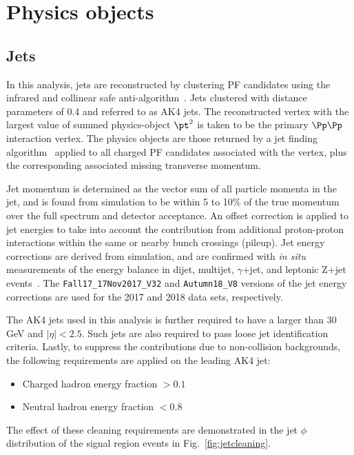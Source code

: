 \section{Physics objects} \label{sec:objects}

\subsection{Jets}
\label{sec:objects_ak4}
In this analysis, jets are reconstructed by clustering PF candidates
using the infrared and collinear safe anti-\kt algorithm~\cite{Cacciari:2008gp}. Jets clustered
with distance parameters of 0.4 and referred to as AK4 jets.
The reconstructed vertex with the largest value of summed physics-object $\pt^2$ is taken to
be the primary $\Pp\Pp$ interaction vertex. The physics objects are those returned by a
jet finding algorithm~\cite{Cacciari:2008gp,Cacciari:2011ma} applied to all charged PF candidates
associated with the vertex, plus the corresponding associated missing transverse momentum.

Jet momentum is determined as the vector sum of all particle momenta in the jet,
and is found from simulation to be within 5 to 10\% of the true momentum over the full \pt
spectrum and detector acceptance. An offset correction is applied to jet energies to take
into account the contribution from additional proton-proton interactions within the
same or nearby bunch crossings (pileup). Jet energy corrections are derived from simulation,
and are confirmed with {\it in situ} measurements of the energy balance in dijet, multijet,
$\gamma$+jet, and leptonic Z+jet events~\cite{Khachatryan:2016kdb}. The \texttt{Fall17\_17Nov2017\_V32} and \texttt{Autumn18\_V8}
versions of the jet energy corrections are used for the 2017 and 2018 data sets, respectively.

The AK4 jets used in this analysis is further required to have a \pt larger than 30 GeV
and $|\eta| < 2.5$. Such jets are also required to pass loose jet identification criteria.
Lastly, to suppress the contributions due to non-collision backgrounds, the following
requirements are applied on the leading AK4 jet:
\begin{itemize}
\item Charged hadron energy fraction $> 0.1$
\item Neutral hadron energy fraction $< 0.8$
\end{itemize}

The effect of these cleaning requirements are demonstrated in the jet $\phi$ distribution of
the signal region events in Fig.~\ref{fig:jetcleaning}.

